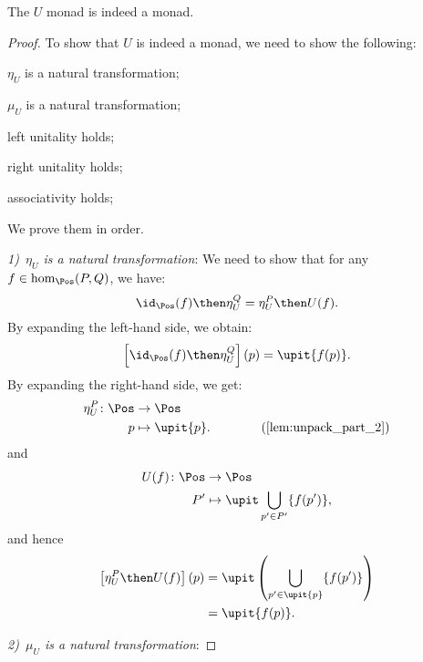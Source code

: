 \begin{lemma}
  The $U$ monad is indeed a monad.
\end{lemma}
\begin{proof}
  To show that $U$ is indeed a monad, we need to show the following:
  \begin{compactenum}
    \item $\eta_U$ is a natural transformation;
    \item $\mu_U$ is a natural transformation;
    \item left unitality holds;
    \item right unitality holds;
    \item associativity holds;
  \end{compactenum}
  We prove them in order.

  \emph{1)~$\eta_U$ is a natural transformation}: We need to show that for any~$f\in \hom_{\Pos}(P,Q)$, we have:
  \begin{equation}
    \id_{\Pos}(f)\then \eta_{U}^Q=\eta_{U}^P\then U(f).
  \end{equation}
  By expanding the left-hand side, we obtain:
  \begin{equation}
    \left[\id_{\Pos}(f)\then \eta_{U}^Q\right](p)=\upit \{f(p)\}.
  \end{equation}
  By expanding the right-hand side, we get:
  \begin{equation}
    \begin{aligned}
      \eta_{U}^P\colon \Pos &\to \Pos\\
      p&\mapsto \upit \{p\}. \qquad \qquad (\cref{lem:unpack_part_2})
    \end{aligned}
  \end{equation}
  and
  \begin{equation}
    \begin{aligned}
      U(f)\colon \Pos &\to \Pos\\
      P'&\mapsto \upit \bigcup_{p'\in P'}\{f(p')\},
    \end{aligned}
  \end{equation}
  and hence
  \begin{equation}
    \begin{aligned}
      \left[\eta_{U}^P\then U(f)\right](p)&=\upit \left( \bigcup_{p'\in \upit \{p\}} \{f(p')\}\right)\\
      &=\upit \{f(p)\}.
    \end{aligned}
  \end{equation}

  \emph{2)~$\mu_U$ is a natural transformation}:
\end{proof}
